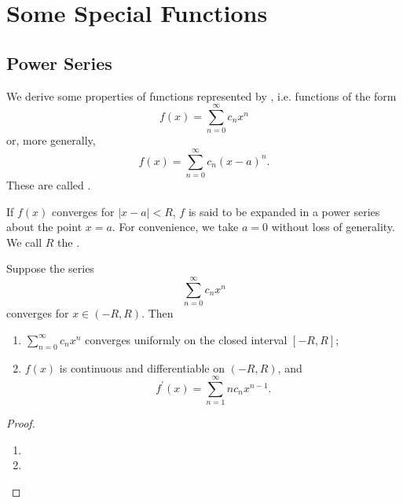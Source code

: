 \chapter{Some Special Functions}
\section{Power Series}
We derive some properties of functions represented by , i.e. functions of the form
\[ f(x)=\sum_{n=0}^\infty c_nx^n \]
or, more generally,
\[ f(x)=\sum_{n=0}^\infty c_n(x-a)^n. \]
These are called .

If $f(x)$ converges for $|x-a|<R$, $f$ is said to be expanded in a power series about the point $x=a$. For convenience, we take $a=0$ without loss of generality. We call $R$ the .

\begin{theorem}
Suppose the series 
\[ \sum_{n=0}^\infty c_nx^n \]
converges for $x\in(-R,R)$. Then
\begin{enumerate}[label=(\arabic*)]
\item $\sum_{n=0}^\infty c_nx^n$ converges uniformly on the closed interval $[-R,R]$;
\item $f(x)$ is continuous and differentiable on $(-R,R)$, and 
\[ f^\prime(x)=\sum_{n=1}^\infty nc_nx^{n-1}. \]
\end{enumerate}
\end{theorem}

\begin{proof} \
\begin{enumerate}[label=(\roman*)]
\item 
\item 
\end{enumerate}
\end{proof}